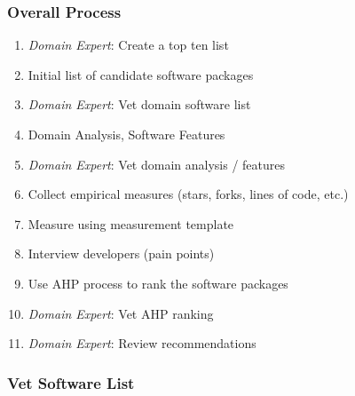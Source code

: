 \documentclass[t,12pt,numbers,fleqn]{beamer}
\begin{document}
\begin{frame}
\frametitle{Overall Process}

\begin{enumerate}
\item \emph{Domain Expert}: Create a top ten list
\item Initial list of candidate software packages
\item \emph{Domain Expert}: Vet domain software list
\item Domain Analysis, Software Features
\item \emph{Domain Expert}: Vet domain analysis / features
\item Collect empirical measures (stars, forks, lines of code, etc.)
\item Measure using measurement template
\item Interview developers (pain points)
\item Use AHP process to rank the software packages
\item \emph{Domain Expert}: Vet AHP ranking
\item \emph{Domain Expert}: Review recommendations %
\end{enumerate}

\end{frame}


\begin{frame}
\frametitle{Vet Software List}

\bi
\item {}
\item {}
\item {}
\item {}
\ei
  
\end{frame}

\end{document}
